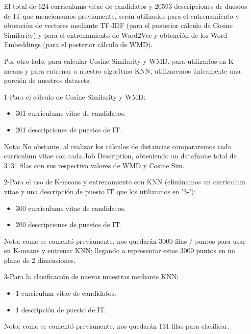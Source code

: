 \documentclass[12pt,a4paper]{article}
\begin{document}
\begin{sloppypar}
El total de 624 curriculums vitae de candidatos y 20593 descripciones de duestos de IT que mencionamos previamente, serán utilizados para el entrenamiento y obtención de vectores mediante TF-IDF (para el posterior cálculo de Cosine Similarity) y para el entrenamiento de Word2Vec y obtención de los Word Embeddings (para el posterior cálculo de WMD).

Por otro lado, para calcular Cosine Similarity y WMD, para utilizarlos en K-means y para entrenar a nuestro algoritmo KNN, utilizaremos únicamente una porción de nuestros datasets:

1-Para el cálculo de Cosine Similarity y WMD:
\begin{itemize}
\item 301 curriculums vitae de candidatos.
\item 201 descripciones de puestos de IT.
\end{itemize}
Nota: No obstante, al realizar los cálculos de distancias compararemos cada curriculum vitae con cada Job Description, obteniendo un dataframe total de 3131 filas con sus respectivo valores de WMD y Cosine Sim.

2-Para el uso de K-means y entrenamiento con KNN (eliminamos un curriculum vitae y una descripción de puesto IT que los utilizamos en '3-'):
\begin{itemize}
\item 300 curriculums vitae de candidatos.
\item 200 descripciones de puestos de IT.
\end{itemize}        
Nota: como se comentó previamente, nos quedarán 3000 filas / puntos para usar en K-means y entrenar KNN; llegando a representar estos 3000 puntos en un plano de 2 dimensiones.

3-Para la clasificación de nuevas muestras mediante KNN:
\begin{itemize}
\item 1 curriculum vitae de candidatos.
\item 1 descripción de puesto de IT.
\end{itemize}
Nota: como se comentó previamente, nos quedarán 131 filas para clasificar.


\end{sloppypar}
\end{document}
